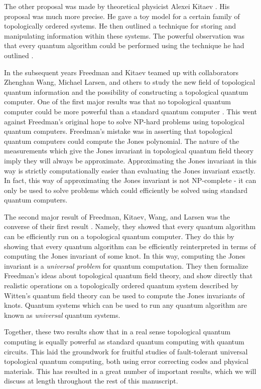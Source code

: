 \documentclass{article}
\theoremstyle{definition}
\numberwithin{figure}{section}
\begin{document}
The other proposal was made by theoretical physicist Alexei Kitaev \cite{kitaev2003fault}. His proposal was much more precise. He gave a toy model for a certain family of topologically ordered systems. He then outlined a technique for storing and manipulating information within these systems. The powerful observation was that every quantum algorithm could be performed using the technique he had outlined \cite{mochon2003anyons}.

In the subsequent years Freedman and Kitaev teamed up with collaborators Zhenghan Wang, Michael Larsen, and others to study the new field of topological quantum information and the possibility of constructing a topological quantum computer. One of the first major results was that no topological quantum computer could be more powerful than a standard quantum computer \cite{freedman2002simulation}. This went against Freedman’s original hope to solve NP-hard problems using topological quantum computers. Freedman’s mistake was in asserting that topological quantum computers could compute the Jones polynomial. The nature of the measurements which give the Jones invariant in topological quantum field theory imply they will always be approximate. Approximating the Jones invariant in this way is strictly computationally easier than evaluating the Jones invariant exactly. In fact, this way of approximating the Jones invariant is not NP-complete - it can only be used to solve problems which could efficiently be solved using standard quantum computers.

The second major result of Freedman, Kitaev, Wang, and Larsen was the converse of their first result \cite{freedman2002modular}. Namely, they showed that every quantum algorithm can be efficiently run on a topological quantum computer. They do this by showing that every quantum algorithm can be efficiently reinterpreted in terms of computing the Jones invariant of some knot. In this way, computing the Jones invariant is a \textit{universal problem} for quantum computation. They then formalize Freedman’s ideas about topological quantum field theory, and show directly that realistic operations on a topologically ordered quantum system described by Witten’s quantum field theory can be used to compute the Jones invariants of knots. Quantum systems which can be used to run any quantum algorithm are known as \textit{universal} quantum systems.

Together, these two results show that in a real sense topological quantum computing is equally powerful as standard quantum computing with quantum circuits. This laid the groundwork for fruitful studies of fault-tolerant universal topological quantum computing, both using error correcting codes and physical materials. This has resulted in a great number of important results, which we will discuss at length throughout the rest of this manuscript.
\end{document}

